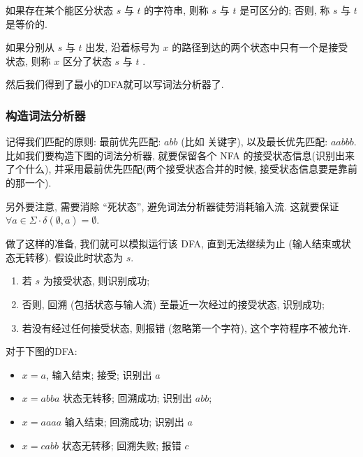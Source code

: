 \documentclass{ctexart}
\begin{document}
\begin{definition}
如果存在某个能区分状态 $s$ 与 $t$ 的字符串, 则称 $s$ 与 $t$ 是可区分的; 否则, 称 $s$ 与 $t$ 是等价的.
    
\end{definition}

\begin{definition}
    如果分别从 $s$ 与 $t$ 出发, 沿着标号为 $x$ 的路径到达的两个状态中只有一个是接受状态, 则称 $x$ 区分了状态 $s$ 与 $t$ .
\end{definition}

然后我们得到了最小的DFA就可以写词法分析器了. 

\subsubsection{构造词法分析器} 记得我们匹配的原则: 最前优先匹配: $a b b$ (比如 关键字), 以及最长优先匹配: $a a b b b$. 比如我们要构造下图的词法分析器, 就要保留各个 NFA 的接受状态信息(识别出来了个什么), 并采用最前优先匹配(两个接受状态合并的时候, 接受状态信息要是靠前的那一个).


另外要注意, 需要消除 “死状态”, 避免词法分析器徒劳消耗输入流. 这就要保证$\forall a \in \Sigma \cdot \delta(\emptyset, a)=\emptyset$. 

做了这样的准备, 我们就可以模拟运行该 DFA, 直到无法继续为止 (输人结束或状态无转移). 假设此时状态为 $s$.

\begin{enumerate}
    \item 若 $s$ 为接受状态, 则识别成功;
    \item 否则, 回溯 (包括状态与输人流) 至最近一次经过的接受状态, 识别成功;
    \item 若没有经过任何接受状态, 则报错 (忽略第一个字符), 这个字符程序不被允许. 
\end{enumerate}

\begin{example}
    对于下图的DFA: 


    \begin{itemize}
        \item $x=a$, 输入结束; 接受; 识别出 $a$
        \item $x=a b b a$ 状态无转移; 回溯成功; 识别出 $a b b$; 
        \item $x=a a a a$ 输入结束; 回溯成功; 识别出 $a$
        \item $x=c a b b$ 状态无转移; 回溯失败; 报错 $c$
    \end{itemize}

\end{example}
\end{document}
